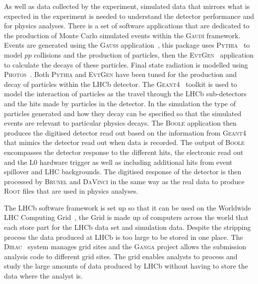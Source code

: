 As well as data collected by the experiment, simulated data that mirrors what is expected in the experiment is needed to understand the detector performance and for physics analyses. There is a set of software applications that are dedicated to the production of Monte Carlo simulated events within the \textsc{Gaudi} framework. Events are generated using the \textsc{Gauss} application~\cite{1742-6596-331-3-032047, Clemencic:2011zza}, this package uses \textsc{Pythia}~\cite{Sjostrand:2006za,Sjostrand:2007gs} to model $pp$ collisions and the production of particles, then the \textsc{Evt}\textsc{Gen}~\cite{Lange:2001uf} application to calculate the decays of these particles. Final state radiation is modelled using \textsc{Photos}~\cite{Golonka:2005pn}. Both \textsc{Pythia} and \textsc{Evt}\textsc{Gen} have been tuned for the production and decay of particles within the LHCb detector. The \textsc{Geant4}~\cite{Agostinelli:2002hh,Allison:2006ve} toolkit is used to model the interaction of particles as the travel through the LHCb sub-detectors and the hits made by particles in the detector. In the simulation the type of particles generated and how they decay can be specified so that the simulated events are relevant to particular physics decays. The \textsc{Boole} application then produces the digitised detector read out based on the information from \textsc{Geant4} that mimics the detector read out when data is recorded. The output of \textsc{Boole} encompasses the detector response to the different hits, the electronic read out and the L0 hardware trigger as well as including additional hits from event spillover and LHC backgrounds. The digitised response of the detector is then processed by \textsc{Brunel} and \textsc{DaVinci} in the same way as the real data to produce \textsc{Root} files that are used in physics analyses. %

The LHCb software framework is set up so that it can be used on the Worldwide LHC Computing Grid~\cite{Bird:2011zz, WWCG}, the Grid is made up of computers across the world that each store part for the LHCb data set and simulation data. Despite the stripping process the data produced at LHCb is too large to be stored in one place. The \textsc{Dirac}~\cite{Paterson:1397926} system manages grid sites and the \textsc{Ganga} project allows the submission analysis code to different grid sites. The grid enables analysts to process and study the large amounts of data produced by LHCb without having to store the data where the analyst is. 






